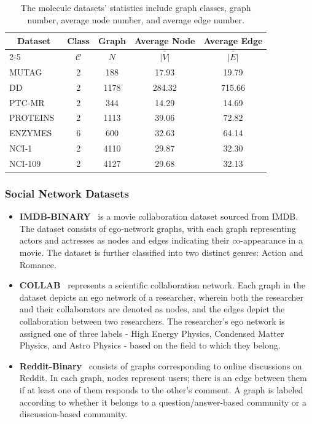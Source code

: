 \documentclass[10pt,journal,compsoc]{IEEEtran}
\begin{document}
\begin{table}[htbp]
  \centering
  \caption{The molecule datasets' statistics include graph classes, graph number, average node number, and average edge number.}
    \begin{tabular}{lcccc}
    \toprule
    \toprule
    \multicolumn{1}{c}{\multirow{2}[0]{*}{\textbf{Dataset}}} & \textbf{Class} & \textbf{Graph} & \textbf{Average Node} & \textbf{Average Edge} \\
          \cline{2-5} & $\mathcal{C}$     & $N$     & $\bar{|V|}$     & $\bar{|E|}$ \\
    \midrule
    MUTAG~\cite{dataset-mutag}          & 2         & 188       & 17.93             & 19.79\\
    DD~\cite{dataset-dd}                & 2         & 1178      & 284.32            & 715.66\\
    PTC-MR~\cite{dataset-ptc-mr}        & 2         & 344       & 14.29             & 14.69\\
    PROTEINS~\cite{dataset-protein}     & 2         & 1113      & 39.06             & 72.82\\
    ENZYMES~\cite{dataset-protein}      & 6         & 600       & 32.63             & 64.14\\
    NCI-1~\cite{dataset-nci}            & 2         & 4110      & 29.87             & 32.30\\
    NCI-109~\cite{dataset-nci}          & 2         & 4127      & 29.68             & 32.13\\
    \bottomrule
    \end{tabular}%
  \label{dataset-molecule}%
\end{table}%


\subsubsection{Social Network Datasets}
\begin{itemize}
  \item \textbf{IMDB-BINARY}~\cite{dataset-mutag} is a movie collaboration dataset sourced from IMDB. The dataset consists of ego-network graphs, with each graph representing actors and actresses as nodes and edges indicating their co-appearance in a movie. The dataset is further classified into two distinct genres: Action and Romance.
  \item \textbf{COLLAB}~\cite{dataset-dd} represents a scientific collaboration network. Each graph in the dataset depicts an ego network of a researcher, wherein both the researcher and their collaborators are denoted as nodes, and the edges depict the collaboration between two researchers. The researcher's ego network is assigned one of three labels - High Energy Physics, Condensed Matter Physics, and Astro Physics - based on the field to which they belong.
  \item \textbf{Reddit-Binary}~\cite{dataset-ptc-mr} consists of graphs corresponding to online discussions on Reddit. In each graph, nodes represent users; there is an edge between them if at least one of them responds to the other’s comment. A graph is labeled according to whether it belongs to a question/answer-based community or a discussion-based community.
\end{itemize}
\end{document}
